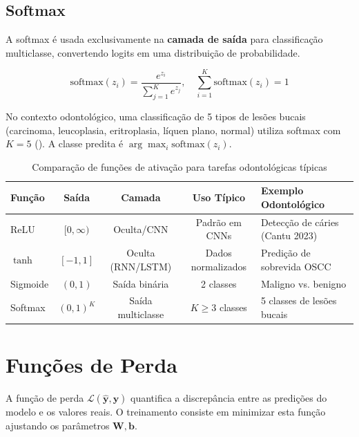 \subsection{Softmax}

A softmax é usada exclusivamente na \textbf{camada de saída} para classificação
multiclasse, convertendo logits em uma distribuição de probabilidade.

\begin{equation}
  \text{softmax}(z_i) = \frac{e^{z_i}}{\sum_{j=1}^{K} e^{z_j}}, \quad
  \sum_{i=1}^{K} \text{softmax}(z_i) = 1
  \label{eq:softmax}
\end{equation}

No contexto odontológico, uma classificação de 5 tipos de lesões bucais (carcinoma,
leucoplasia, eritroplasia, líquen plano, normal) utiliza softmax com $K=5$
(). A classe predita é $\arg\max_i \text{softmax}(z_i)$.

\begin{table}[H]
  \centering
  \caption{Comparação de funções de ativação para tarefas odontológicas típicas}
  \label{tab:ativacao-odonto}
  \begin{tabularx}{\textwidth}{lcccX}
    \toprule
    \textbf{Função} & \textbf{Saída} & \textbf{Camada} & \textbf{Uso Típico} & \textbf{Exemplo Odontológico} \\
    \midrule
    ReLU & $[0, \infty)$ & Oculta/CNN & Padrão em CNNs & Detecção de cáries (Cantu 2023) \\
    $\tanh$ & $[-1, 1]$ & Oculta (RNN/LSTM) & Dados normalizados & Predição de sobrevida OSCC \\
    Sigmoide & $(0, 1)$ & Saída binária & 2 classes & Maligno vs. benigno \\
    Softmax & $(0,1)^K$ & Saída multiclasse & $K \geq 3$ classes & 5 classes de lesões bucais \\
    \bottomrule
  \end{tabularx}
\end{table}

\section{Funções de Perda}
\label{sec:funcoes-perda}

A função de perda $\mathcal{L}(\mathbf{\hat{y}}, \mathbf{y})$ quantifica a discrepância
entre as predições do modelo e os valores reais. O treinamento consiste em minimizar
esta função ajustando os parâmetros $\mathbf{W}, \mathbf{b}$.


